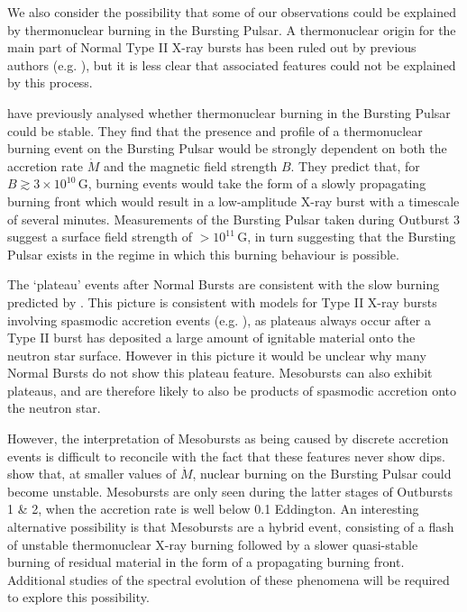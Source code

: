 \par We also consider the possibility that some of our observations could be explained by thermonuclear burning in the Bursting Pulsar.  A thermonuclear origin for the main part of Normal Type II X-ray bursts has been ruled out by previous authors (e.g. \citealp{Lewin_BP}), but it is less clear that associated features could not be explained by this process.
\par \citet{Bildsten_Nuclear} have previously analysed whether thermonuclear burning in the Bursting Pulsar could be stable.  They find that the presence and profile of a thermonuclear burning event on the Bursting Pulsar would be strongly dependent on both the accretion rate $\dot{M}$ and the magnetic field strength $B$.  They predict that, for $B\gtrsim3\times10^{10}$\,G, burning events would take the form of a slowly propagating burning front which would result in a low-amplitude X-ray burst with a timescale of several minutes.  Measurements of the Bursting Pulsar taken during Outburst 3 suggest a surface field strength of $>10^{11}$\,G, in turn suggesting that the Bursting Pulsar exists in the regime in which this burning behaviour is possible.
\par The `plateau' events after Normal Bursts are consistent with the slow burning predicted by \citet{Bildsten_Nuclear}.  This picture is consistent with models for Type II X-ray bursts involving spasmodic accretion events (e.g. \citealp{Spruit_Type2Mod,Walker_Type2Mod}), as plateaus always occur after a Type II burst has deposited a large amount of ignitable material onto the neutron star surface.  However in this picture it would be unclear why many Normal Bursts do not show this plateau feature.  Mesobursts can also exhibit plateaus, and are therefore likely to also be products of spasmodic accretion onto the neutron star.
\par However, the interpretation of Mesobursts as being caused by discrete accretion events is difficult to reconcile with the fact that these features never show dips.  \citet{Bildsten_Nuclear} show that, at smaller values of $\dot{M}$, nuclear burning on the Bursting Pulsar could become unstable.  Mesobursts are only seen during the latter stages of Outbursts 1 \& 2, when the accretion rate is well below 0.1 Eddington.  An interesting alternative possibility is that Mesobursts are a hybrid event, consisting of a flash of unstable thermonuclear X-ray burning followed by a slower quasi-stable burning of residual material in the form of a propagating burning front.  Additional studies of the spectral evolution of these phenomena will be required to explore this possibility.
